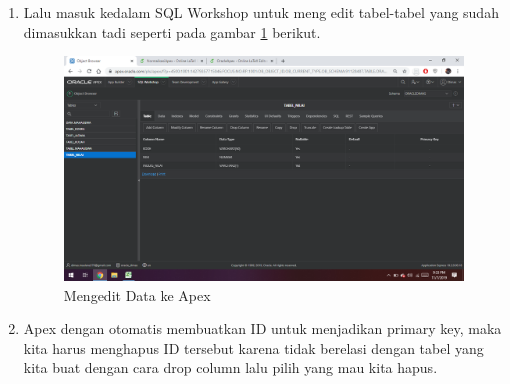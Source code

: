 \documentclass[12pt, times new roman, a4paper]{article}
\begin{document}
\begin{enumerate}
    \item Lalu masuk kedalam SQL Workshop untuk meng edit tabel-tabel yang sudah dimasukkan tadi seperti pada gambar \ref{apex5} berikut.
                \begin{figure}[!htbp]
        \centering
        \includegraphics[scale=0.25]{figures/apex5.png}
        \caption{Mengedit Data ke Apex}
        \label{apex5}
    \end{figure}
    
    \item Apex dengan otomatis membuatkan ID untuk menjadikan primary key, maka kita harus menghapus ID tersebut karena tidak berelasi dengan tabel yang kita buat dengan cara drop column lalu pilih yang mau kita hapus.


\end{enumerate}
\end{document}
